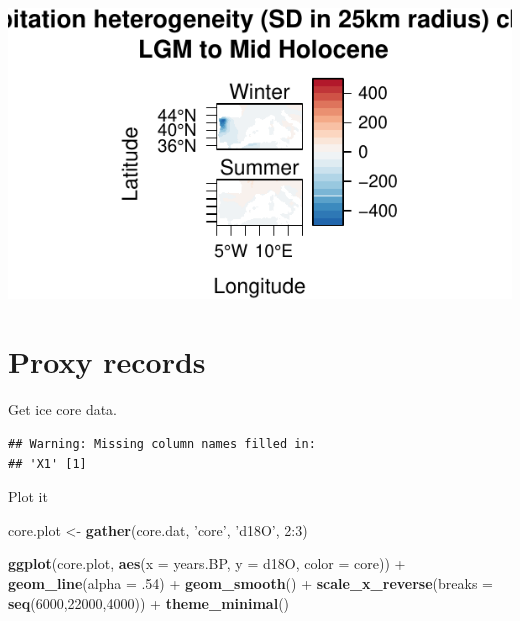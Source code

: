 \documentclass[11pt,]{tufte-handout}
\newenvironment{Shaded}{}{}
\newcommand{\KeywordTok}[1]{\textcolor[rgb]{0.00,0.44,0.13}{\textbf{{#1}}}}
\newcommand{\DataTypeTok}[1]{\textcolor[rgb]{0.56,0.13,0.00}{{#1}}}
\newcommand{\DecValTok}[1]{\textcolor[rgb]{0.25,0.63,0.44}{{#1}}}
\newcommand{\StringTok}[1]{\textcolor[rgb]{0.25,0.44,0.63}{{#1}}}
\newcommand{\NormalTok}[1]{{#1}}
\begin{document}
\includegraphics{proxymodelcomparison_files/figure-latex/unnamed-chunk-10-1}


\section{Proxy records}\label{proxy-records}

Get ice core data.

\begin{Shaded}
\end{Shaded}

\begin{verbatim}
## Warning: Missing column names filled in:
## 'X1' [1]
\end{verbatim}

Plot it

\begin{Shaded}
\begin{Highlighting}[]
\NormalTok{core.plot <-}\StringTok{ }\KeywordTok{gather}\NormalTok{(core.dat, }\StringTok{'core'}\NormalTok{, }\StringTok{'d18O'}\NormalTok{, }\DecValTok{2}\NormalTok{:}\DecValTok{3}\NormalTok{)}

\KeywordTok{ggplot}\NormalTok{(core.plot, }\KeywordTok{aes}\NormalTok{(}\DataTypeTok{x =} \NormalTok{years.BP, }\DataTypeTok{y =} \NormalTok{d18O, }\DataTypeTok{color =} \NormalTok{core)) +}
\StringTok{  }\KeywordTok{geom_line}\NormalTok{(}\DataTypeTok{alpha =} \NormalTok{.}\DecValTok{54}\NormalTok{) +}
\StringTok{  }\KeywordTok{geom_smooth}\NormalTok{() +}
\StringTok{  }\KeywordTok{scale_x_reverse}\NormalTok{(}\DataTypeTok{breaks =} \KeywordTok{seq}\NormalTok{(}\DecValTok{6000}\NormalTok{,}\DecValTok{22000}\NormalTok{,}\DecValTok{4000}\NormalTok{)) +}
\StringTok{  }\KeywordTok{theme_minimal}\NormalTok{()}
\end{Highlighting}
\end{Shaded}
\end{document}
